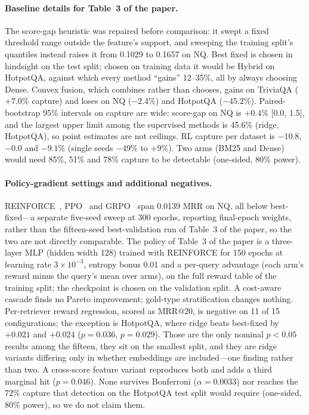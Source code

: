 \documentclass{article}
\begin{document}
\paragraph{Baseline details for Table~3 of the paper.} The score-gap heuristic was repaired before
comparison: it swept a fixed threshold range outside the feature's support, and sweeping the
training split's quantiles instead raises it from 0.1029 to 0.1657 on NQ. Best fixed is chosen in
hindsight on the test split; chosen on training data it would be Hybrid on HotpotQA, against which
every method ``gains'' 12--35\%, all by always choosing Dense. Convex fusion, which combines rather
than chooses, gains on TriviaQA ($+7.0\%$ capture) and loses on NQ ($-2.4\%$) and HotpotQA
($-45.2\%$). Paired-bootstrap 95\% intervals on capture are wide: score-gap on NQ is $+0.4\%$
[0.0, 1.5], and the largest upper limit among the supervised methods is 45.6\% (ridge, HotpotQA),
so point estimates are not ceilings. RL capture per dataset is $-10.8$, $-0.0$ and $-9.1\%$
(single seeds $-49\%$ to $+9\%$). Two arms (BM25 and Dense) would need 85\%, 51\% and 78\% capture
to be detectable (one-sided, 80\% power).

\paragraph{Policy-gradient settings and additional negatives.}
REINFORCE~\cite{williams1992reinforce}, PPO~\cite{schulman2017ppo} and
GRPO~\cite{shao2024deepseekmath} span 0.0139 MRR on NQ, all below best-fixed---a separate
five-seed sweep at 300 epochs, reporting final-epoch weights, rather than the fifteen-seed
best-validation run of Table~3 of the paper, so the two are not directly comparable.
The policy of Table~3 of the paper is a three-layer MLP (hidden width 128) trained with REINFORCE
for 150 epochs at learning rate $3{\times}10^{-3}$, entropy bonus 0.01 and a per-query advantage
(each arm's reward minus the query's mean over arms), on the full reward table of the training
split; the checkpoint is chosen on the validation split. A cost-aware cascade finds no Pareto improvement; gold-type
stratification changes nothing. Per-retriever reward regression, scored as MRR@20, is negative on 11 of 15
configurations; the exception is HotpotQA, where ridge beats best-fixed by $+0.021$ and $+0.024$
($p{=}0.036$, $p{=}0.029$). Those are the only nominal $p<0.05$ results among the fifteen, they
sit on the smallest split, and they are ridge variants differing only in whether embeddings are
included---one finding rather than two. A cross-score feature variant reproduces both and adds a
third marginal hit ($p{=}0.046$). None survives Bonferroni ($\alpha{=}0.0033$) nor reaches the
72\% capture that detection on the HotpotQA test split would require (one-sided, 80\% power), so we
do not claim them.
\end{document}
